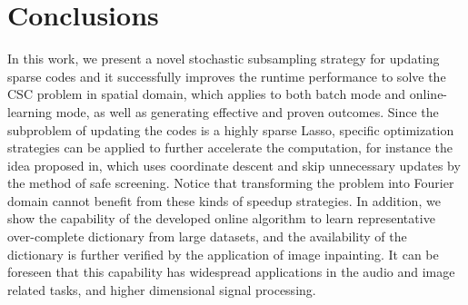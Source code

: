 \section{Conclusions}
In this work, we present a novel stochastic subsampling strategy for updating sparse codes and it successfully improves the runtime performance to solve the CSC problem in spatial domain, which applies to both batch mode and online-learning mode, as well as generating effective and proven outcomes. Since the subproblem of updating the codes is a highly sparse Lasso, specific optimization strategies can be applied to further accelerate the computation, for instance the idea proposed in, which uses coordinate descent and skip unnecessary updates by the method of safe screening. Notice that transforming the problem into Fourier domain cannot benefit from these kinds of speedup strategies. In addition, we show the capability of the developed online algorithm to learn representative over-complete dictionary from large datasets, and the availability of the dictionary is further verified by the application of image inpainting. It can be foreseen that this capability has widespread applications in the audio and image related tasks, and higher dimensional signal processing.